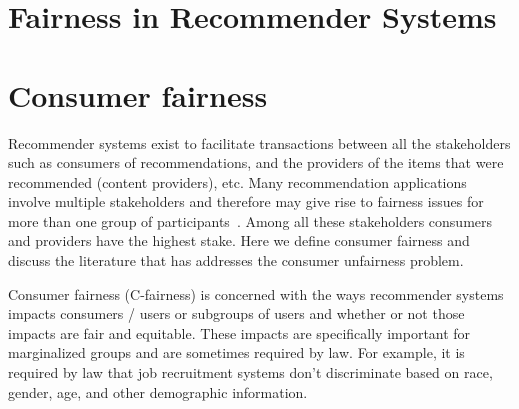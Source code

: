\section{Fairness in Recommender Systems}
\label{sec:fairness_recsys}





\section{Consumer fairness}
\label{fairness_cf}

Recommender systems exist to facilitate transactions between all the stakeholders such as consumers of recommendations, and the providers of the items that were recommended (content providers), etc. Many recommendation applications involve multiple stakeholders and therefore may give rise to fairness issues for more than one group of participants~\cite{burke_multisided_2017}. Among all these stakeholders consumers and providers have the highest stake. 
Here we  define consumer fairness and discuss the literature that has addresses the consumer unfairness problem.

Consumer fairness (C-fairness) is concerned with the ways recommender systems impacts consumers / users or subgroups of users and whether or not those impacts are fair and equitable. These impacts are specifically important for marginalized groups and are sometimes required by law. For example, it is required by law that job recruitment systems don't discriminate based on race, gender, age, and other demographic information. 

